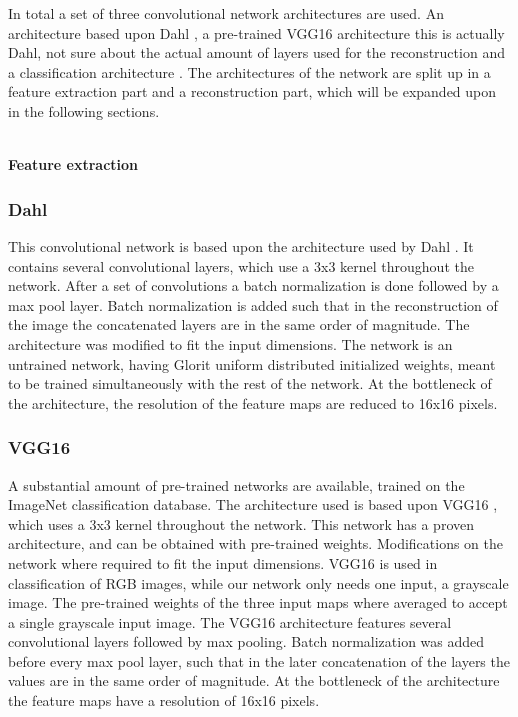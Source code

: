 {\color{red} 
In total a set of three convolutional network architectures are used. An architecture based upon Dahl \cite{Dahl}, a pre-trained VGG16 \cite{Simonyan} architecture {\color{red} this is actually Dahl,  not sure about the actual amount of layers used for the reconstruction} and a classification architecture \cite{Zhang}. The architectures of the network are split up in a feature extraction part and a reconstruction part, which will be expanded upon in the following sections.}\\ 
\\%

{\color{red}
\textbf{Feature extraction}


\subsubsection{Dahl}%


This convolutional network is based upon the architecture used by Dahl \cite{Dahl}. It contains several convolutional layers, which use a 3x3 kernel throughout the network. After a set of convolutions a batch normalization is done followed by a max pool layer. Batch normalization is added such that in the reconstruction of the image the concatenated layers are in the same order of magnitude. The architecture was modified to fit the input dimensions. The network is an untrained network, having Glorit uniform distributed \cite{Glorot} initialized weights, meant to be trained simultaneously with the rest of the network. At the bottleneck of the architecture, the resolution of the feature maps are reduced to 16x16 pixels.
 

\subsubsection{VGG16}
A substantial amount of pre-trained networks are available, trained on the ImageNet classification database. The architecture used is based upon VGG16 \cite{Simonyan}, which uses a 3x3 kernel throughout the network. This network has a proven architecture, and can be obtained with pre-trained weights. Modifications on the network where required to fit the input dimensions. VGG16 is used in classification of RGB images, while our network only needs one input, a grayscale image. The pre-trained weights of the three input maps where averaged to accept a single grayscale input image. The VGG16 architecture features several convolutional layers followed by max pooling. Batch normalization was added before every max pool layer, such that in the later concatenation of the layers the values are in the same order of magnitude. At the bottleneck of the architecture the feature maps have a resolution of 16x16 pixels. 

}
